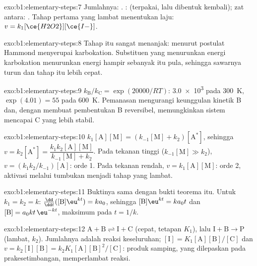 \begin{solution}{exo:b1:elementary-steps:7}
Jumlahnya: . :  (terpakai, lalu
dibentuk kembali); zat antara: . Tahap pertama yang lambat
menentukan laju: $v = k_1[\ce{H2O2}][\ce{I-}]$.
\end{solution}

\begin{solution}{exo:b1:elementary-steps:8}
Tahap itu sangat menanjak: menurut postulat Hammond 
menyerupai karbokation. Substituen yang menurunkan energi karbokation
menurunkan energi  hampir sebanyak itu pula, sehingga
sawarnya turun dan tahap itu lebih cepat.
\end{solution}

\begin{solution}{exo:b1:elementary-steps:9}
$k_{\mathrm B}/k_{\mathrm C} = \exp(20000/RT)$: \num{3.0e3} pada
\qty{300}{K}, $\exp(4.01) = 55$ pada \qty{600}{K}. Pemanasan mengurangi
keunggulan kinetik B dan, dengan membuat pembentukan B reversibel,
memungkinkan sistem mencapai C yang lebih stabil.
\end{solution}

\begin{solution}{exo:b1:elementary-steps:10}
$k_1[\mathrm{A}][\mathrm{M}] = (k_{-1}[\mathrm{M}] + k_2)[\mathrm{A}^*]$,
sehingga $v = k_2[\mathrm{A}^*] = \dfrac{k_1k_2[\mathrm{A}][\mathrm{M}]}{k_{-1}[\mathrm{M}]
+ k_2}$. Pada tekanan tinggi ($k_{-1}[\mathrm{M}] \gg k_2$), $v =
(k_1k_2/k_{-1})[\mathrm{A}]$: orde 1. Pada tekanan rendah, $v =
k_1[\mathrm{A}][\mathrm{M}]$: orde 2, aktivasi melalui tumbukan menjadi
tahap yang lambat.
\end{solution}

\begin{solution}{exo:b1:elementary-steps:11}
Buktinya sama dengan bukti teorema itu. Untuk $k_1 = k_2 = k$:
$\frac{\dd}{\dd t}([\mathrm{B}]\eu^{kt}) = ka_0$, sehingga $[\mathrm{B}]\eu^{kt} =
ka_0t$ dan $[\mathrm{B}] = a_0kt\,\eu^{-kt}$, maksimum pada $t = 1/k$.
\end{solution}

\begin{solution}{exo:b1:elementary-steps:12}
$\mathrm{A} + \mathrm{B} \rightleftharpoons \mathrm{I} + \mathrm{C}$ (cepat,
tetapan $K_1$), lalu $\mathrm{I} + \mathrm{B} \to \mathrm{P}$ (lambat,
$k_2$). Jumlahnya adalah reaksi keseluruhan; $[\mathrm{I}] =
K_1[\mathrm{A}][\mathrm{B}]/[\mathrm{C}]$ dan $v = k_2[\mathrm{I}][\mathrm{B}]
= k_2K_1[\mathrm{A}][\mathrm{B}]^2/[\mathrm{C}]$: produk samping, yang
dilepaskan pada prakesetimbangan, memperlambat reaksi.
\end{solution}

